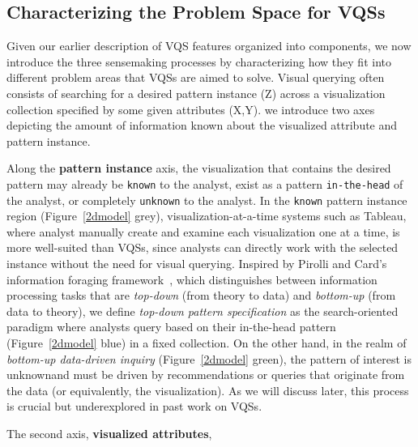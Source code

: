 \subsection{Characterizing the Problem Space for VQSs}
Given our earlier description of VQS features organized into components, we now introduce the three sensemaking processes by characterizing how they fit into different problem areas that VQSs are aimed to solve. Visual querying often consists of searching for a desired pattern instance (Z) across a visualization collection specified by some given attributes (X,Y). we introduce two axes depicting the amount of information known about the visualized attribute and pattern instance.%
\par Along the \textbf{pattern instance} axis,
the visualization that contains
the desired pattern may already be \texttt{known} to the analyst,
exist as a pattern \texttt{in-the-head} of the analyst,
or completely \texttt{unknown} to the analyst.
In the \texttt{known} pattern instance region (Figure~\ref{2dmodel} grey), visualization-at-a-time systems such as Tableau,
where analyst manually create and examine each visualization one at a time,
is more well-suited than VQSs, since analysts can directly work with the selected instance without the need for visual querying.
Inspired by Pirolli and Card's information
foraging framework~\cite{Pirolli}, which distinguishes
between information processing tasks that are \textit{top-down}
(from theory to data) and \textit{bottom-up} (from data to theory),
we define \textit{top-down pattern specification} as the search-oriented paradigm where analysts query based on their
in-the-head pattern (Figure~\ref{2dmodel} blue) in a fixed collection.
On the other hand, in the realm of \textit{bottom-up
data-driven inquiry} (Figure~\ref{2dmodel} green),
the pattern of interest is unknownand must be driven by recommendations
or queries that originate from the data (or equivalently, the visualization).
As we will discuss later, this process is crucial
but underexplored in past work on VQSs.
\par The second axis, \textbf{visualized attributes},
